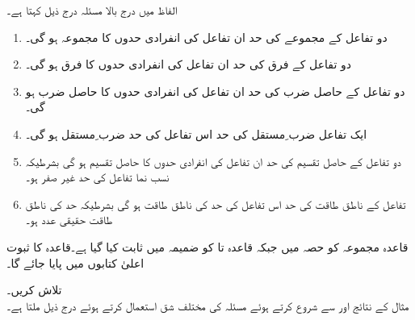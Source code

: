 الفاظ میں درج بالا مسئلہ درج ذیل کہتا ہے۔
\begin{enumerate}
\item
دو تفاعل کے مجموعے کی حد ان تفاعل کی انفرادی حدوں کا مجموعہ ہو گی۔
\item
دو تفاعل کے فرق  کی حد ان تفاعل کی  انفرادی حدوں کا فرق ہو گی۔
\item
دو تفاعل کے حاصل ضرب  کی حد ان تفاعل کی  انفرادی حدوں کا حاصل ضرب  ہو گی۔
\item
ایک تفاعل ضرب ِمستقل کی حد اس تفاعل کی حد ضرب ِمستقل ہو گی۔
\item
دو تفاعل کے حاصل تقسیم کی حد ان تفاعل کی انفرادی حدوں کا حاصل تقسیم ہو گی  بشرطیکہ نسب نما تفاعل کی حد غیر صفر ہو۔
\item
تفاعل کے ناطق طاقت کی حد اس تفاعل کی  حد کی ناطق طاقت ہو گی بشرطیکہ حد کی ناطق طاقت  حقیقی عدد ہو۔ 
\end{enumerate}

قاعدہ مجموعہ کو حصہ  میں جبکہ قاعدہ  تا   کو ضمیمہ  میں ثابت کیا گیا ہے۔قاعدہ  کا ثبوت اعلیٰ  کتابوں میں پایا جائے گا۔

 تلاش کریں۔\\
مثال  کے نتائج  اور   سے شروع کرتے ہوئے  مسئلہ  کی مختلف شق استعمال کرتے ہوئے درج ذیل ملتا ہے۔

